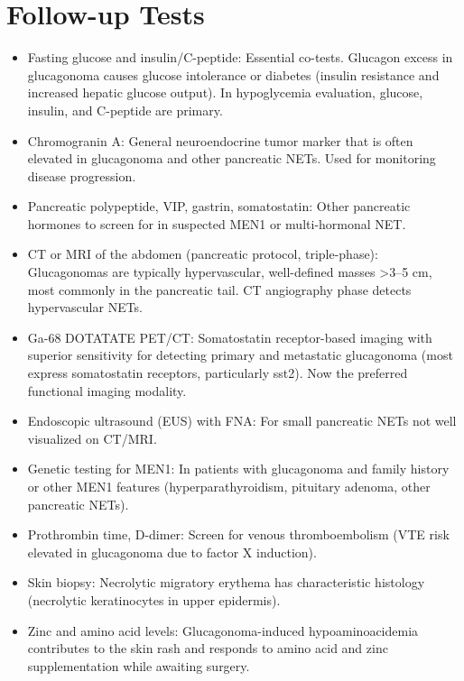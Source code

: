 \section*{Follow-up Tests}
\begin{itemize}
  \item Fasting glucose and insulin/C-peptide: Essential co-tests. Glucagon excess in glucagonoma causes glucose intolerance or diabetes (insulin resistance and increased hepatic glucose output). In hypoglycemia evaluation, glucose, insulin, and C-peptide are primary.
  \item Chromogranin A: General neuroendocrine tumor marker that is often elevated in glucagonoma and other pancreatic NETs. Used for monitoring disease progression.
  \item Pancreatic polypeptide, VIP, gastrin, somatostatin: Other pancreatic hormones to screen for in suspected MEN1 or multi-hormonal NET.
  \item CT or MRI of the abdomen (pancreatic protocol, triple-phase): Glucagonomas are typically hypervascular, well-defined masses >3--5 cm, most commonly in the pancreatic tail. CT angiography phase detects hypervascular NETs.
  \item Ga-68 DOTATATE PET/CT: Somatostatin receptor-based imaging with superior sensitivity for detecting primary and metastatic glucagonoma (most express somatostatin receptors, particularly sst2). Now the preferred functional imaging modality.
  \item Endoscopic ultrasound (EUS) with FNA: For small pancreatic NETs not well visualized on CT/MRI.
  \item Genetic testing for MEN1: In patients with glucagonoma and family history or other MEN1 features (hyperparathyroidism, pituitary adenoma, other pancreatic NETs).
  \item Prothrombin time, D-dimer: Screen for venous thromboembolism (VTE risk elevated in glucagonoma due to factor X induction).
  \item Skin biopsy: Necrolytic migratory erythema has characteristic histology (necrolytic keratinocytes in upper epidermis).
  \item Zinc and amino acid levels: Glucagonoma-induced hypoaminoacidemia contributes to the skin rash and responds to amino acid and zinc supplementation while awaiting surgery.
\end{itemize}

